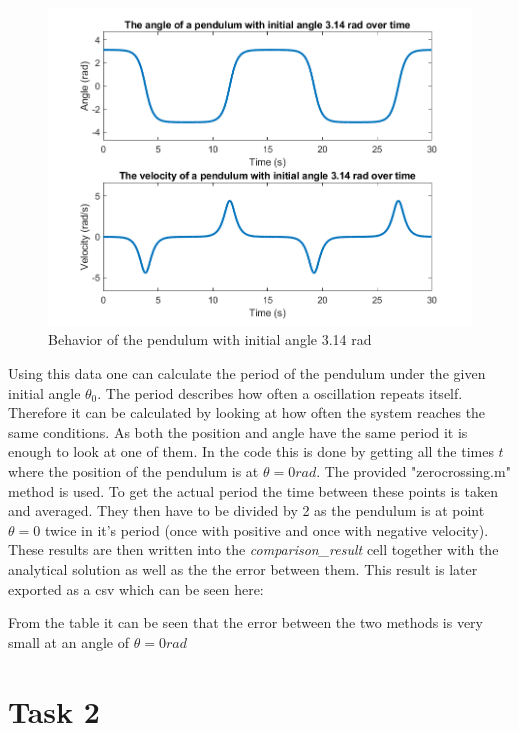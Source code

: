 \documentclass[14pt]{article}
\begin{document}
\begin{figure}[H]
  \includegraphics[width=14cm]{./output/assignment1/3.14_rad.png}
  \caption{Behavior of the pendulum with initial angle 3.14 rad}
  \label{fig:figure5}
\end{figure}

Using this data one can calculate the period of the pendulum under the given
initial angle $\theta_0$. The period describes how often a oscillation repeats itself.
Therefore it can be calculated by looking at how often the system reaches the same conditions.
As both the position and angle have the same period it is enough to look at one of them.
In the code this is done by getting all the times $t$ where the position of the pendulum
is at $\theta = 0 rad$. The provided "zerocrossing.m" method is used. To get the actual period
the time between these points is taken and averaged. They then have to be divided by 2 as the pendulum
is at point $\theta = 0$ twice in it's period (once with positive and once with negative velocity). These results
are then written into the \textit{comparison\_result} cell together with the analytical solution as well as the
the error between them. This result is later exported as a csv which can be seen here:


From the table it can be seen that the error between the two methods is very small at an angle of $\theta = 0 rad$

\section{Task 2}
\end{document}
